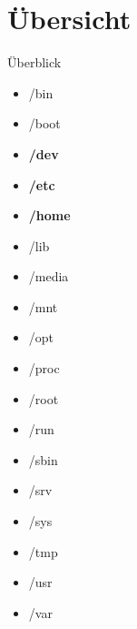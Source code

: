 \section{Übersicht}
\begin{frame}{Überblick}
	
	\begin{minipage}{0.48\linewidth}
		\begin{itemize}
			\item /bin 
			\item /boot 
			\item \textbf{/dev} 
			\item \textbf{/etc} 
			\item \textbf{/home}
			\item /lib 
			\item /media 
			\item /mnt 
			\item /opt 
		\end{itemize}
	\end{minipage}%
	\hspace{0.02cm}
	\begin{minipage}{0.48\linewidth}
		\begin{itemize}
			\item /proc
			\item /root 
			\item /run 
			\item /sbin 
			\item /srv 
			\item /sys 
			\item /tmp 
			\item /usr 
			\item /var 
		\end{itemize}
	\end{minipage}
\end{frame}
